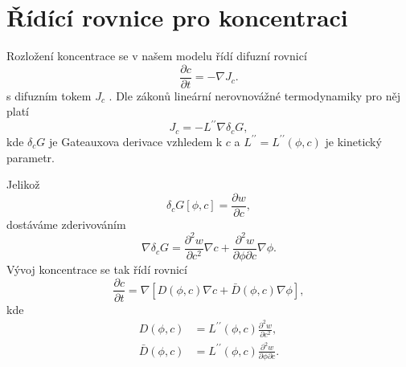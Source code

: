 \section{Řídící rovnice pro koncentraci}
Rozložení koncentrace se v našem modelu řídí difuzní rovnicí
\begin{equation}
    \frac{\partial c}{\partial t} = - \nabla J_c.
\end{equation}
s difuzním tokem \(J_c\) \cite{Loginova_2004}.
Dle zákonů lineární nerovnovážné termodynamiky \cite{Loginova_2004} pro něj platí
\begin{equation}
    J_c = - L^{\prime \prime}\nabla \delta_c G,
\end{equation}
kde \(\delta_c G\) je Gateauxova derivace vzhledem k \(c\) a \(L^{\prime \prime} = L^{\prime \prime}(\phi, c)\) je kinetický parametr.

Jelikož
\begin{equation}
    \delta_c G[\phi, c] = \frac{\partial w}{\partial c},
\end{equation}
dostáváme zderivováním
\begin{equation}
    \nabla \delta_c G = \frac{\partial^2 w}{\partial c^2} \nabla c + \frac{\partial^2 w}{\partial \phi \partial c} \nabla \phi.
\end{equation}
Vývoj koncentrace se tak řídí rovnicí
\begin{equation}
    \frac{\partial c}{\partial t} = \nabla \left[ D(\phi, c) \nabla c + \bar D(\phi, c) \nabla \phi \right],
\end{equation}
kde
\begin{align}
    D(\phi, c) &= L^{\prime \prime}(\phi, c) \frac{\partial^2 w}{\partial c^2},\\
    \bar{D}(\phi, c) &=  L^{\prime \prime}(\phi, c) \frac{\partial^2 w}{\partial \phi \partial c}.
\end{align}



